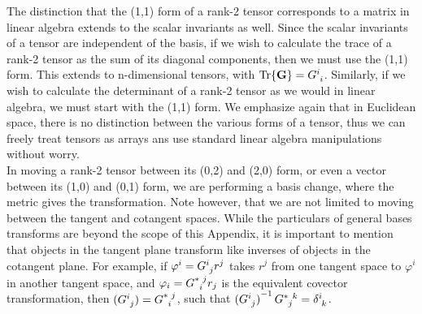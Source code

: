 \begin{appendices}
The distinction that the (1,1) form of a rank-2 tensor corresponds to a matrix in linear algebra extends to the scalar invariants as well.
Since the scalar invariants of a tensor are independent of the basis, if we wish to calculate the trace of a rank-2 tensor as the sum of its diagonal components, then we must use the (1,1) form.
This extends to n-dimensional tensors, with $\textrm{Tr}\{ \mathbf{G} \} = \tensor{G}{^i_i}$.
Similarly, if we wish to calculate the determinant of a rank-2 tensor as we would in linear algebra, we must start with the (1,1) form.
We emphasize again that in Euclidean space, there is no distinction between the various forms of a tensor, thus we can freely treat tensors as arrays ans use standard linear algebra manipulations without worry. \\

In moving a rank-2 tensor between its (0,2) and (2,0) form, or even a vector between its (1,0) and (0,1) form, we are performing a basis change, where the metric gives the transformation.
Note however, that we are not limited to moving between the tangent and cotangent spaces.
While the particulars of general bases transforms are beyond the scope of this Appendix, it is important to mention that objects in the tangent plane transform like inverses of objects in the cotangent plane.
For example, if $\varphi^i = \tensor{G}{^i_j}r^j$ takes $r^j$ from one tangent space to $\varphi^i$ in another tangent space, and $\varphi_i = \tensor{G}{^*_i^j}r_j$ is the equivalent covector transformation, then $(\tensor{G}{^i_j}) = \tensor{G}{^*_i^j}$, such that ${(\tensor{G}{^i_j})}^{-1}\,\tensor{G}{^*_j^k} = \tensor{\delta}{^i_k}$.




\end{appendices}
